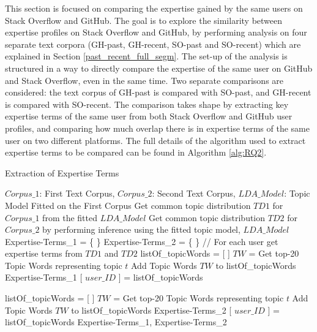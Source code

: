         This section is focused on comparing the expertise gained by the same users on Stack Overflow and GitHub. The goal is to explore the similarity between expertise profiles on Stack Overflow and GitHub, by performing analysis on four separate text corpora (GH-past, GH-recent, SO-past and SO-recent) which are explained in Section \ref{past_recent_full_segm}. The set-up of the analysis is structured in a way to directly compare the expertise of the same user on GitHub and Stack Overflow, even in the same time. Two separate comparisons are considered: the text corpus of GH-past is compared with SO-past, and GH-recent is compared with SO-recent. The comparison takes shape by extracting key expertise terms of the same user from both Stack Overflow and GitHub user profiles, and comparing how much overlap there is in expertise terms of the same user on two different platforms. The full details of the algorithm used to extract expertise terms to be compared can be found in Algorithm \ref{alg:RQ2}.
        
        \begin{algorithm}
            \caption{Extraction of Expertise Terms}
            \label{alg:RQ2}
            \begin{algorithmic}[1]
                \REQUIRE $Corpus\_1$: First Text Corpus, $Corpus\_2$: Second Text Corpus, $LDA\_Model$: Topic Model Fitted on the First Corpus
                \STATE Get common topic distribution $TD1$ for $Corpus\_1$ from the fitted $LDA\_Model$
                \STATE Get common topic distribution $TD2$ for $Corpus\_2$ by performing inference using the fitted topic model, $LDA\_Model$
                \STATE Expertise-Terms\_1 = \{ \}
                \STATE Expertise-Terms\_2 = \{ \}
                \STATE
                \STATE // For each user get expertise terms from $TD1$ and $TD2$ 
                    \STATE listOf\_topicWords = [ ]
                        \STATE $TW$ = Get top-20 Topic Words representing topic $t$
                        \STATE Add Topic Words $TW$ to listOf\_topicWords 
                    \ENDFOR
                    \STATE Expertise-Terms\_1 [ $user\_ID$ ] = listOf\_topicWords
                    \STATE
                    
                    \STATE listOf\_topicWords = [ ]
                        \STATE $TW$ = Get top-20 Topic Words representing topic $t$
                        \STATE Add Topic Words $TW$ to listOf\_topicWords 
                    \ENDFOR
                    \STATE Expertise-Terms\_2 [ $user\_ID$ ] = listOf\_topicWords
                    \STATE
                \ENDFOR
                \RETURN Expertise-Terms\_1, Expertise-Terms\_2
            \end{algorithmic}
        \end{algorithm}
        

